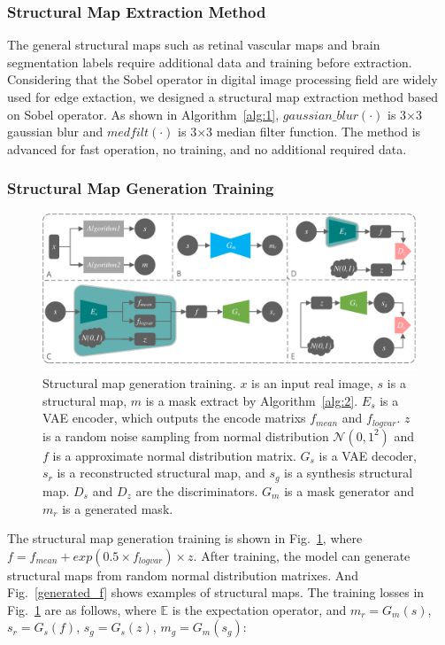 \documentclass[runningheads]{llncs}
\begin{document}
	\subsubsection{Structural Map Extraction Method}
	The general structural maps such as retinal vascular maps\cite{41costa2017towards} and brain segmentation labels \cite{4shin2018medical} require additional data and training before extraction. Considering that the Sobel operator\cite{147Sobel} in digital image processing field are widely used for edge extaction, we designed a structural map extraction method based on Sobel operator. As shown in Algorithm~\ref{alg:1}, $gaussian\_blur(\cdot)$ is 3$\times$3 gaussian blur and $medfilt(\cdot)$ is 3$\times$3 median filter function. The method is advanced for fast operation, no training, and no additional required data. 
	\subsubsection{Structural Map Generation Training}
	\begin{figure}[th]
		\centering
		\includegraphics[width=1\columnwidth]{figures/feature_train}
		\caption{Structural map generation training. $x$ is an input real image, $s$ is a structural map, $m$ is a mask extract by Algorithm~\ref{alg:2}. $E_s$ is a VAE encoder, which outputs the encode matrixs $f_{mean}$ and $f_{logvar}$. $z$ is a random noise sampling from normal distribution $\mathcal{N}(0,1^2)$ and $f$ is a approximate normal distribution matrix. $G_s$ is a VAE decoder, $s_r$ is a reconstructed structural map, and $s_g$ is a synthesis structural map. $D_{s}$ and $D_{z}$ are the discriminators. $G_m$ is a mask generator and $m_r$ is a generated mask.}
		\label{feature_train}
	\end{figure}
	The structural map generation training is shown in Fig.~\ref{feature_train}, where $f=f_{mean}+exp(0.5\times f_{logvar})\times z$. After training, the model can generate structural maps from random normal distribution matrixes. And Fig.~\ref{generated_f} shows examples of structural maps. The training losses in Fig.~\ref{feature_train} are as follows, where $\mathbb{E}$ is the expectation operator, and $m_r=G_m(s)$, $s_r=G_s(f)$, $s_g=G_s(z)$, $m_g=G_m(s_g)$: 
\end{document}

